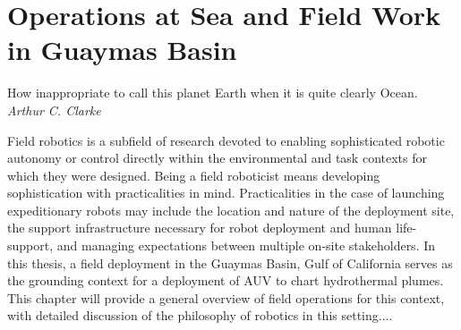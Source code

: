 \chapter{Operations at Sea and Field Work in Guaymas Basin}

\begin{center}
    \begin{minipage}{0.5\textwidth}
      \begin{small}
        How inappropriate to call this planet Earth when it is quite clearly Ocean.\\ \emph{Arthur C. Clarke}
      \end{small}
    \end{minipage}
    \vspace{0.5cm}
\end{center}

Field robotics is a subfield of research devoted to enabling sophisticated robotic autonomy or control directly within the environmental and task contexts for which they were designed.
Being a field roboticist means developing sophistication with practicalities in mind.
Practicalities in the case of launching expeditionary robots may include the location and nature of the deployment site, the support infrastructure necessary for robot deployment and human life-support, and managing expectations between multiple on-site stakeholders.
In this thesis, a field deployment in the Guaymas Basin, Gulf of California serves as the grounding context for a deployment of AUV \Sentry to chart hydrothermal plumes.
This chapter will provide a general overview of field operations for this context, with detailed discussion of the philosophy of robotics in this setting....


